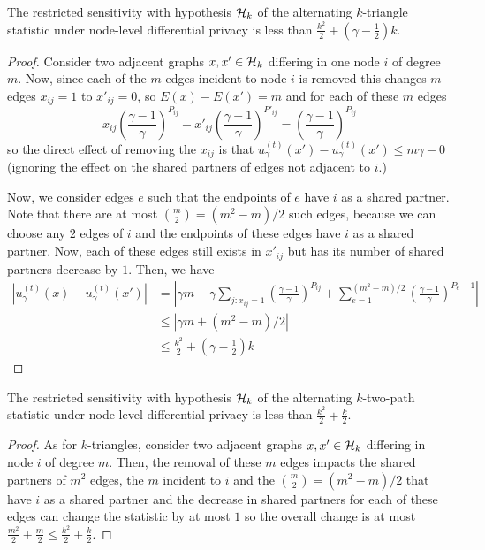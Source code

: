 \begin{claim}
The restricted sensitivity with hypothesis $\mathcal{H}_k$ of the alternating $k$-triangle statistic under node-level differential privacy is less than $\frac{k^2}{2} +  \left(\gamma - \frac{1}{2}\right)k$.
\end{claim}
\begin{proof}
Consider two adjacent graphs $x, x'\in \mathcal{H}_k$ differing in one node $i$ of degree $m$. Now, since each of the $m$ edges incident to node $i$ is removed this changes $m$ edges $x_{ij} = 1$ to $x'_{ij} = 0$, so $E(x) - E(x') = m$ and for each of these $m$ edges 
$$ x_{ij} \left( \frac{\gamma - 1}{\gamma}\right)^{P_{ij}} - x'_{ij} \left( \frac{\gamma - 1}{\gamma}\right)^{P'_{ij}} = \left( \frac{\gamma - 1}{\gamma}\right)^{P_{ij}} $$ so the direct effect of removing the $x_{ij}$ is that $u_\gamma^{(t)}(x') - u_\gamma^{(t)}(x') \leq m \gamma -0$ (ignoring the effect on the shared partners of edges not adjacent to $i$.)

Now, we consider edges $e$ such that the endpoints of $e$ have $i$ as a shared partner. Note that there are at most $\binom{m}{2} = (m^2 - m)/2$ such edges, because we can choose any $2$ edges of $i$ and the endpoints of these edges have $i$ as a shared partner. Now, each of these edges still exists in $x'_{ij}$ but has its number of shared partners decrease by $1$. Then, we have 
\begin{align*}
|u_\gamma^{(t)}(x) - u_\gamma^{(t)}(x')| &= \left|\gamma m - \gamma \sum_{j: x_{ij} = 1}\left(\frac{\gamma-1}{\gamma} \right)^{P_{ij}}  + \sum_{e= 1}^{\left(m^2 - m\right)/2}  \left(\frac{\gamma-1}{\gamma} \right)^{P_e-1}    \right|\\
& \leq |\gamma m + \left(m^2 - m\right)/2|\\
& \leq \frac{k^2}{2} +  \left(\gamma - \frac{1}{2}\right)k 
\end{align*}
\end{proof}

\begin{claim}
The restricted sensitivity with hypothesis $\mathcal{H}_k$ of the alternating $k$-two-path statistic under node-level differential privacy is less than $\frac{k^2}{2} + \frac{k}{2}$. 
\end{claim}
\begin{proof}
As for $k$-triangles, consider two adjacent graphs $x, x' \in \mathcal{H}_k$ differing in node $i$ of degree $m$. Then, the removal of these $m$ edges impacts the shared partners of $m^2$ edges, the $m$ incident to $i$ and the $\binom{m}{2} = (m^2 - m)/2$ that have $i$ as a shared partner and the decrease in shared partners for each of these edges can change the statistic by at most $1$ so the overall change is at most $\frac{m^2}{2} + \frac{m}{2} \leq \frac{k^2}{2} + \frac{k}{2}$.
\end{proof}

